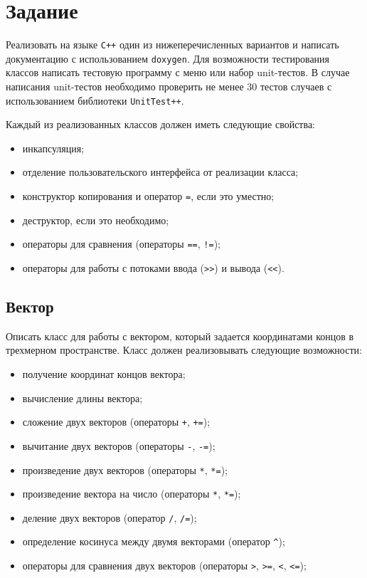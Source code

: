 \documentclass[a4paper,12pt]{article}
\begin{document}
\section{Задание}
\label{sec:Task}

Реализовать на языке \verb|С++| один из нижеперечисленных вариантов и
написать документацию с использованием \verb|doxygen|. Для возможности
тестирования классов написать тестовую программу с меню или набор
unit-тестов. В случае написания unit-тестов необходимо проверить не
менее 30 тестов случаев с использованием библиотеки \verb|UnitTest++|.

Каждый из реализованных классов должен иметь следующие свойства:

\begin{itemize}
\item инкапсуляция;
\item отделение пользовательского интерфейса от реализации класса;
\item конструктор копирования и оператор \lstinline|=|, если это
  уместно;
\item деструктор, если это необходимо;
\item операторы для сравнения (операторы \lstinline|==|,
  \lstinline|!=|);
\item операторы для работы с потоками ввода (\lstinline|>>|) и вывода
  (\lstinline|<<|).
\end{itemize}

\subsection{Вектор}

Описать класс для работы с вектором, который задается координатами
концов в трехмерном пространстве.  Класс должен реализовывать
следующие возможности:

\begin{itemize}
\item получение координат концов вектора;
\item вычисление длины вектора;
\item сложение двух векторов (операторы \lstinline|+|,
  \lstinline|+=|);
\item вычитание двух векторов (операторы \lstinline|-|,
  \lstinline|-=|);
\item произведение двух векторов (операторы \lstinline|*|,
  \lstinline|*=|);
\item произведение вектора на число (операторы \lstinline|*|,
  \lstinline|*=|);
\item деление двух векторов (оператор \lstinline|/|, \lstinline|/=|);
\item определение косинуса между двумя векторами (оператор
  \lstinline|^|);
\item операторы для сравнения двух векторов (операторы \lstinline|>|,
  \lstinline|>=|, \lstinline|<|, \lstinline|<=|);
\end{itemize}
\end{document}
